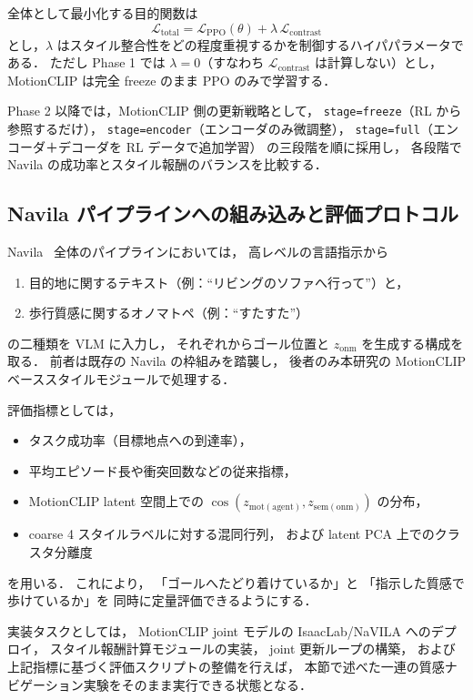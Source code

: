 \documentclass[a4paper,10pt]{jsarticle}
\begin{document}
全体として最小化する目的関数は
\[
  \mathcal{L}_\mathrm{total}
  = \mathcal{L}_{\mathrm{PPO}}(\theta)
  + \lambda\,\mathcal{L}_{\mathrm{contrast}}
\]
とし，$\lambda$ はスタイル整合性をどの程度重視するかを制御するハイパパラメータである．
ただし Phase 1 では $\lambda = 0$（すなわち $\mathcal{L}_{\mathrm{contrast}}$ は計算しない）とし，
MotionCLIP は完全 freeze のまま PPO のみで学習する．

Phase 2 以降では，MotionCLIP 側の更新戦略として，
\texttt{stage=freeze}（RL から参照するだけ），
\texttt{stage=encoder}（エンコーダのみ微調整），
\texttt{stage=full}（エンコーダ＋デコーダを RL データで追加学習）
の三段階を順に採用し，
各段階で Navila の成功率とスタイル報酬のバランスを比較する．

\subsection{Navila パイプラインへの組み込みと評価プロトコル}

Navila~\cite{navila} 全体のパイプラインにおいては，
高レベルの言語指示から
\begin{enumerate}
  \item 目的地に関するテキスト（例：``リビングのソファへ行って''）と，
  \item 歩行質感に関するオノマトペ（例：``すたすた''） 
\end{enumerate}
の二種類を VLM に入力し，
それぞれからゴール位置と $z_{\mathrm{onm}}$ を生成する構成を取る．
前者は既存の Navila の枠組みを踏襲し，
後者のみ本研究の MotionCLIP ベーススタイルモジュールで処理する．

評価指標としては，
\begin{itemize}
  \item タスク成功率（目標地点への到達率），
  \item 平均エピソード長や衝突回数などの従来指標，
  \item MotionCLIP latent 空間上での
        $\cos(z_{\mathrm{mot(agent)}}, z_{\mathrm{sem(onm)}})$ の分布，
  \item coarse 4 スタイルラベルに対する混同行列，
        および latent PCA 上でのクラスタ分離度
\end{itemize}
を用いる．
これにより，
「ゴールへたどり着けているか」と
「指示した質感で歩けているか」を
同時に定量評価できるようにする．

実装タスクとしては，
MotionCLIP joint モデルの IsaacLab/NaVILA へのデプロイ，
スタイル報酬計算モジュールの実装，
joint 更新ループの構築，
および上記指標に基づく評価スクリプトの整備を行えば，
本節で述べた一連の質感ナビゲーション実験をそのまま実行できる状態となる．
\end{document}
